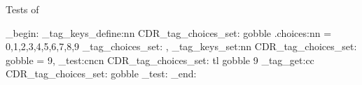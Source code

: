 Tests of 

\ExplSyntaxOn
\group_begin:
\CDR_tag_keys_define:nn { CDR_tag_choices_set: } {
  gobble .choices:nn = {
    0,1,2,3,4,5,6,7,8,9
  } {
    \CDR_tag_choices_set:
  },
}
\CDR_tag_keys_set:nn { CDR_tag_choices_set: } {
  gobble = 9,
}
\CDR_test:cncn { CDR_tag_choices_set: } { tl } { gobble } { 9 }
\CDR_tag_get:cc { CDR_tag_choices_set: } { gobble }
\CDR_test:
\group_end:
\ExplSyntaxOff
